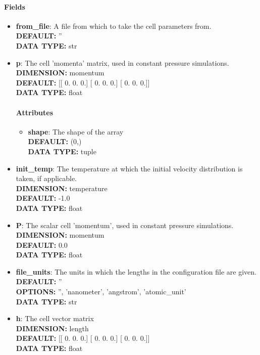 \paragraph{Fields}
 \begin{itemize}
\item {\bf from\_file}:
 A file from which to take the cell parameters from.
{\\ \bf DEFAULT: }''
{\\ \bf DATA TYPE: }str
\item {\bf p}:
 The cell 'momenta' matrix, used in constant pressure simulations.
{\\ \bf DIMENSION: }momentum
{\\ \bf DEFAULT: }
      [[ 0.  0.  0.]
       [ 0.  0.  0.]
       [ 0.  0.  0.]]
{\\ \bf DATA TYPE: }float
\paragraph{Attributes}
 \begin{itemize}
\item {\bf shape}:
 The shape of the array
{\\ \bf DEFAULT: }(0,)
{\\ \bf DATA TYPE: }tuple
\end{itemize}
 
\item {\bf init\_temp}:
 The temperature at which the initial velocity distribution is taken, if applicable.
{\\ \bf DIMENSION: }temperature
{\\ \bf DEFAULT: }-1.0
{\\ \bf DATA TYPE: }float
\item {\bf P}:
 The scalar cell 'momentum', used in constant pressure simulations.
{\\ \bf DIMENSION: }momentum
{\\ \bf DEFAULT: }0.0
{\\ \bf DATA TYPE: }float
\item {\bf file\_units}:
 The units in which the lengths in the configuration file are given.
{\\ \bf DEFAULT: }''
{\\ \bf OPTIONS: }'', 'nanometer', 'angstrom', 'atomic\_unit'
{\\ \bf DATA TYPE: }str
\item {\bf h}:
 The cell vector matrix
{\\ \bf DIMENSION: }length
{\\ \bf DEFAULT: }
      [[ 0.  0.  0.]
       [ 0.  0.  0.]
       [ 0.  0.  0.]]
{\\ \bf DATA TYPE: }float

\end{itemize}
